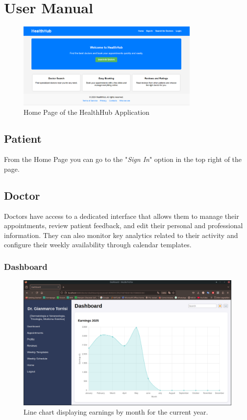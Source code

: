 \chapter{User Manual}

\begin{figure}[H]
	\centering
	\includegraphics[width=0.8\textwidth]{resources/screenshots/homepage.png}
	\caption{Home Page of the HealthHub Application}
	\label{fig:homepage}
\end{figure}

\section{Patient}
From the Home Page you can go to the "\textit{Sign In}" option in the top right of the page. 


\section{Doctor}

Doctors have access to a dedicated interface that allows them to manage their appointments, review patient feedback, and edit their personal and professional information. They can also monitor key analytics related to their activity and configure their weekly availability through calendar templates.

\subsection{Dashboard}

\begin{figure}[!h]
    \centering
	\includegraphics[scale=0.30]{resources/screenshots/doctor_ui/earnings_linechart.png}
    \caption{Line chart displaying earnings by month for the current year.}
    \label{fig:earnings_linechart}
\end{figure}

